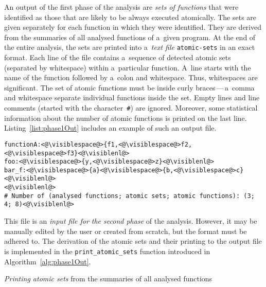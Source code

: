 An output of the first phase of the analysis are \emph{sets of functions} that were identified as those that are likely to be always executed atomically. The sets are given separately for each function in which they were identified. They are derived from the summaries of all analysed functions of a~given program. At the end of the entire analysis, the sets are printed into a~\emph{text file} \texttt{atomic-sets} in an exact format. Each line of the file contains a~sequence of detected atomic sets (separated by whitespace) within a~particular function. A~line starts with the name of the function followed by a~colon and whitespace. Thus, whitespaces are significant. The set of atomic functions must be inside curly braces\,---\,a~comma and whitespace separate individual functions inside the set. Empty lines and line comments (started with the character~\texttt{\#}) are ignored. Moreover, some statistical information about the number of atomic functions is printed on the last line. Listing~\ref{list:phase1Out} includes an example of such an output file.

\begin{lstlisting}[style=plain, label={list:phase1Out}, float=hbt, caption={An example of an \emph{output of the first phase} of the analysis (\texttt{atomic-sets} file)}]
functionA:<@\visiblespace@>{f1,<@\visiblespace@>f2,<@\visiblespace@>f3}<@\visiblenl@>
foo:<@\visiblespace@>{y,<@\visiblespace@>z}<@\visiblenl@>
bar_f:<@\visiblespace@>{a}<@\visiblespace@>{b,<@\visiblespace@>c}<@\visiblenl@>
<@\visiblenl@>
# Number of (analysed functions; atomic sets; atomic functions): (3; 4; 8)<@\visiblenl@>
\end{lstlisting}

This file is an \emph{input file for the second phase} of the analysis. However, it may be manually edited by the user or created from scratch, but the format must be adhered to. The derivation of the atomic sets and their printing to the output file is implemented in the \texttt{print\_atomic\_sets} function introduced in Algorithm~\ref{alg:phase1Out}.

\begin{algorithm}[hbt]
%
%
    \caption{\emph{Printing atomic sets} from the summaries of all analysed functions}
    \label{alg:phase1Out}
\end{algorithm}


